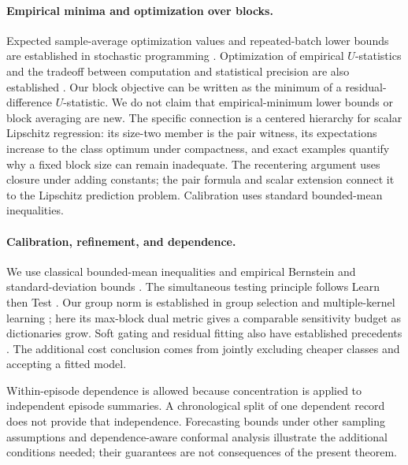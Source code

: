 \paragraph{Empirical minima and optimization over blocks.}
Expected sample-average optimization values and repeated-batch lower bounds
are established in stochastic programming
\citep{linderoth2006empirical,guigues2017confidence}. Optimization of empirical
$U$-statistics and the tradeoff between computation and statistical precision
are also established \citep{clemencon2016scaling}. Our block objective can be
written as the minimum of a residual-difference $U$-statistic. We do not claim
that empirical-minimum lower bounds or block averaging are new. The specific
connection is a centered hierarchy for scalar Lipschitz regression: its
size-two member is the pair witness, its expectations increase to the class
optimum under compactness, and exact examples quantify why a fixed block size
can remain inadequate. The recentering argument uses closure under adding
constants; the pair formula and scalar extension connect it to the Lipschitz
prediction problem. Calibration uses standard bounded-mean inequalities.

\paragraph{Calibration, refinement, and dependence.}
We use classical bounded-mean inequalities \citep{hoeffding1963} and empirical
Bernstein and standard-deviation bounds \citep{maurer2009empirical}. The
simultaneous testing principle follows Learn then Test
\citep{angelopoulos2025ltt}. Our group norm is established in group selection
and multiple-kernel learning \citep{bach2008group}; here its max-block dual
metric gives a comparable sensitivity budget as dictionaries grow. Soft gating
and residual fitting also have established precedents
\citep{jordan1994experts,buhlmann2003boosting}. The additional cost conclusion
comes from jointly excluding cheaper classes and accepting a fitted model.

Within-episode dependence is allowed because concentration is applied to
independent episode summaries. A chronological split of one dependent record
does not provide that independence. Forecasting bounds under other sampling
assumptions \citep{mcdonald2017forecasting} and dependence-aware conformal
analysis \citep{oliveira2024conformal} illustrate the additional conditions
needed; their guarantees are not consequences of the present theorem.
